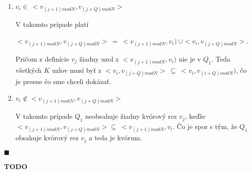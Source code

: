 \begin{enumerate}
  \item $v_i\in\: <v_{(j+1) mod N}, v_{(j+Q) mod N}>$

        V takomto prípade platí

        $<v_{(j+1) mod N}, v_{(j+Q) mod N}>\:=\: <v_{(j+1) mod N}, v_i)\: \cup <v_i, v_{(j+Q) mod N}>$.

        Pričom z definície $v_j$ žiadny uzol z $<v_{(j+1) mod N}, v_i)$ nie je v $Q_1$.
        Teda všetkých $K$ uzlov musí byť z $<v_i, v_{(j+Q) mod N}>\: \subseteq\: <v_i, v_{(i+Q) mod N})$,
        čo je presne čo sme chceli dokázať.
  \item $v_i\notin <v_{(j+1) mod N}, v_{(j+Q) mod N}>$

        V takomto prípade $Q_1$ neobsahuje žiadny kvórový rez $v_j$, keďže\\
        $<v_{(j+1) mod N}, v_{(j+Q) mod N}> \subseteq\: <v_{(j+1) mod N}, v_i$.
        Čo je spor s tým, že $Q_1$ obsahuje kvórový rez $v_j$ a teda je kvórum.
\end{enumerate} $\blacksquare$

\textbf{TODO}